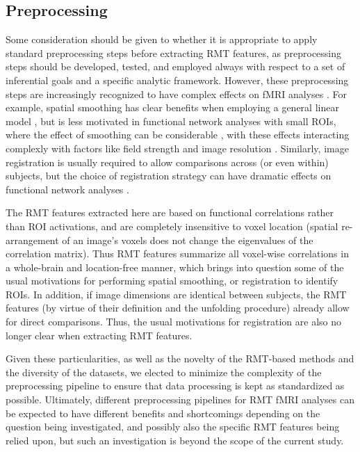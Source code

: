 \documentclass[NETN,manuscript]{stjour-new}
\begin{document}
\subsection{Preprocessing}
Some consideration should be given to whether it is appropriate to apply standard preprocessing
steps before extracting RMT features, as preprocessing steps should be developed, tested, and
employed always with respect to a set of inferential goals and a specific analytic framework.
However, these preprocessing steps are increasingly recognized to have complex effects on fMRI
analyses \citep{parkerBenefitSliceTiming2019}. For example, spatial smoothing has clear benefits
when employing a general linear model
\citep{miklEffectsSpatialSmoothing2008,alakorkkoEffectsSpatialSmoothing2017,worsleyAnalysisFMRITimeSeries1995},
but is less motivated in functional network analyses with small ROIs, where the effect of smoothing
can be considerable
\citep{alakorkkoEffectsSpatialSmoothing2017,goelmanMaximizingNegativeCorrelations2014,trianaEffectsSpatialSmoothing2020},
with these effects interacting complexly with factors like field strength and image resolution
\citep{triantafyllouEffectSpatialSmoothing2006}. Similarly, image registration is usually required
to allow comparisons across (or even within) subjects, but the choice of registration strategy can
have dramatic effects on functional network analyses \citep{magalhaesImpactNormalizationSegmentation2014}.

The RMT features extracted here are based on functional correlations rather than ROI activations,
and are completely insensitive to voxel location (spatial re-arrangement of an image’s voxels does
not change the eigenvalues of the correlation matrix). Thus RMT features summarize all voxel-wise
correlations in a whole-brain and location-free manner, which brings into question some of the usual
motivations for performing spatial smoothing, or registration to identify ROIs. In addition, if
image dimensions are identical between subjects, the RMT features (by virtue of their definition and
the unfolding procedure) already allow for direct comparisons. Thus, the usual motivations for
registration are also no longer clear when extracting RMT features.

Given these particularities, as well as the novelty of the RMT-based methods and the diversity of
the datasets, we elected to minimize the complexity of the preprocessing pipeline to ensure that
data processing is kept as standardized as possible. Ultimately, different preprocessing pipelines
for RMT fMRI analyses can be expected to have different benefits and shortcomings depending on the
question being investigated, and possibly also the specific RMT features being relied upon, but such
an investigation is beyond the scope of the current study.
\end{document}
